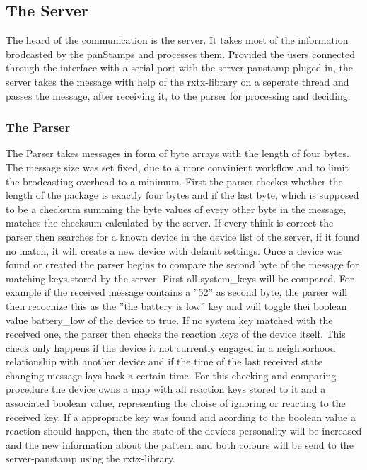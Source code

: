 \subsection{The Server}
The heard of the communication is the server. It takes most of the information brodcasted by the panStamps\cite{panstamp} and processes them.
Provided the users connected through the interface with a serial port with the server-panstamp pluged in, the server takes the message with help of the rxtx-library\cite{rxtx} on a seperate thread and passes the message, after receiving it, to the parser for processing and deciding.

\subsubsection{The Parser}
The Parser takes messages in form of byte arrays with the length of four bytes. The message size was set fixed, due to a more convinient workflow and to limit the brodcasting overhead to a minimum. 
First the parser checkes whether the length of the package is exactly four bytes and if the last byte, which is supposed to be a checksum summing the byte values of every other byte in the message, matches the checksum calculated by the server. If every think is correct the parser then searches for a known device in the device list of the server, if it found no match, it will create a new device with default settings. Once a device was found or created the parser begins to compare the second byte of the message for matching keys stored by the server. First all system\_keys will be compared. For example if the received message contains a ''52'' as second byte, the parser will then recocnize this as the ''the battery is low'' key and will toggle thei boolean value battery\_low of the device to true. 
If no system key matched with the received one, the parser then checks the reaction keys of the device itself. This check only happens if the device it not currently engaged in a neighborhood relationship with another device and if the time of the last received state changing message lays back a certain time. For this checking and comparing procedure the device owns a map with all reaction keys stored to it and a associated boolean value, representing the choise of ignoring or reacting to the received key. If a appropriate key was found and acording to the boolean value a reaction should happen, then the state of the devices personality will be increased and the new information about the pattern and both colours will be send to the server-panstamp using the rxtx-library.

